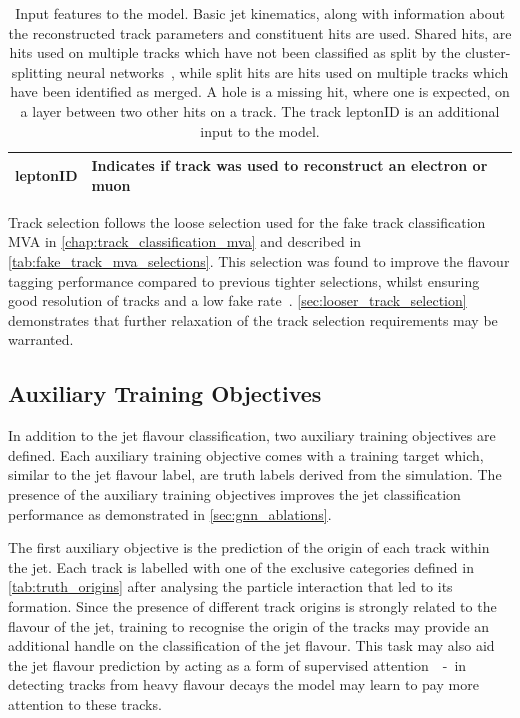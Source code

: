 \begin{table}[!htbp]
\begin{tabular}{ll}
    leptonID   & Indicates if track was used to reconstruct an electron or muon \\
    \hline\bottomrule
  \end{tabular}
  \caption{
    Input features to the \GNN model.
    Basic jet kinematics, along with information about the reconstructed track parameters and constituent hits are used.
    Shared hits, are hits used on multiple tracks which have not been classified as split by the cluster-splitting neural networks~\cite{PERF-2015-08}, while split hits are hits used on multiple tracks which have been identified as merged.
    A hole is a missing hit, where one is expected, on a layer between two other hits on a track.
    The track leptonID is an additional input to the \GNNLep model.
  }
  \label{tab:track_inputs}
\end{table}

Track selection follows the loose selection used for the fake track classification MVA in \cref{chap:track_classification_mva} and described in \cref{tab:fake_track_mva_selections}.
This selection was found to improve the flavour tagging performance compared to previous tighter selections, whilst ensuring good resolution of tracks and a low fake rate~\cite{PERF-2015-08}.
\cref{sec:looser_track_selection} demonstrates that further relaxation of the track selection requirements may be warranted. 


\subsection{Auxiliary Training Objectives}\label{sec:aux-train-objectives}

In addition to the jet flavour classification, two auxiliary training objectives are defined.
Each auxiliary training objective comes with a training target which, similar to the jet flavour label, are truth labels derived from the simulation.
The presence of the auxiliary training objectives improves the jet classification performance as demonstrated in \cref{sec:gnn_ablations}.

The first auxiliary objective is the prediction of the origin of each track within the jet. 
Each track is labelled with one of the exclusive categories defined in \cref{tab:truth_origins} after analysing the particle interaction that led to its formation. 
Since the presence of different track origins is strongly related to the flavour of the jet, training \GNN to recognise the origin of the tracks may provide an additional handle on the classification of the jet flavour.
This task may also aid the jet flavour prediction by acting as a form of supervised attention~\cite{arxiv.2007.08294}~-~in detecting tracks from heavy flavour decays the model may learn to pay more attention to these tracks.

